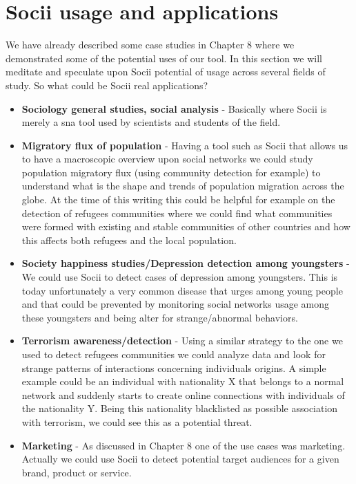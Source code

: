 \section{Socii usage and applications}
We have already described some case studies in Chapter 8 where we demonstrated some of the potential uses of our tool. In this section we will meditate and speculate upon Socii potential of usage across several fields of study. So what could be Socii real applications?

\begin{itemize}
    \item \textbf{Sociology general studies, social analysis} - Basically where Socii is merely a \gls{sna} tool used by scientists and students of the field.
    \item \textbf{Migratory flux of population} - Having a tool such as Socii that allows us to have a macroscopic overview upon social networks we could study population migratory flux (using community detection for example) to understand what is the shape and trends of population migration across the globe. At the time of this writing this could be helpful for example on the detection of refugees communities where we could find what communities were formed with existing and stable communities of other countries and how this affects both refugees and the local population.
    \item \textbf{Society happiness studies/Depression detection among youngsters} - We could use Socii to detect cases of depression among youngsters. This is today unfortunately a very common disease that urges among young people and that could be prevented by monitoring social networks usage among these youngsters and being alter
    for strange/abnormal behaviors.
    \item \textbf{Terrorism awareness/detection} - Using a similar strategy to the one we used to detect refugees communities we could analyze data and look for strange patterns of interactions concerning individuals origins. A simple example could be an individual with nationality X that belongs to a normal network and suddenly starts to create online connections with individuals of the nationality Y. Being this nationality blacklisted as possible association with terrorism, we could see this as a potential threat.
    \item \textbf{Marketing} - As discussed in Chapter 8 one of the use cases was marketing. Actually we could use Socii to detect potential target audiences for a given brand, product or service.
\end{itemize}

